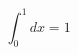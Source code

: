 \documentclass{article}
\begin{document}
\begin{equation} \int_0^1 dx = 1 \end{equation}
\end{document}
